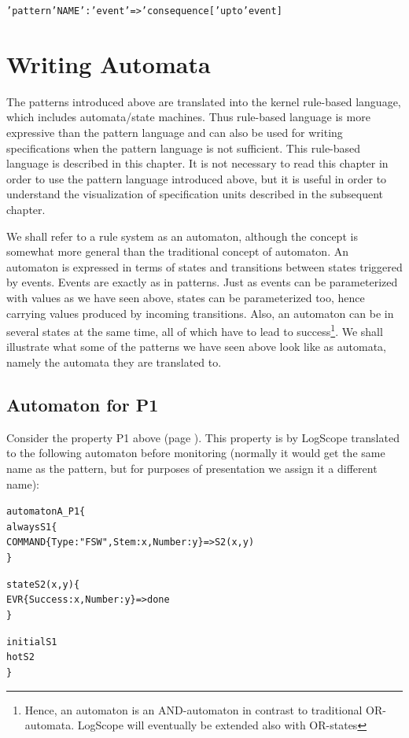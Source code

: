 \documentclass{report}
\newcommand{\logscope}{{\sc LogScope}}
\newenvironment{code}[1] %
{
\vspace{0.5cm}
\begin{center}
\begin{Sbox}
\begin{minipage}{11cm}
\begin{alltt}
{\bf\em #1}
}
{
\end{alltt}
\end{minipage}
\end{Sbox}
\setlength{\fboxsep}{8pt}
\fbox{\TheSbox}
\end{center}
\vspace{0.5cm}
}
\begin{document}
\begin{code}{}
  'pattern' NAME ':' event '=>' consequence ['upto' event]
\end{code}
  
\chapter{Writing Automata}

The patterns introduced above are translated into the kernel rule-based language,
which includes automata/state machines. Thus rule-based language is more expressive
than the pattern language and can also be used for writing specifications when the pattern
language is not sufficient. This rule-based language is described in this chapter. It is not necessary
to read this chapter in order to use the pattern language introduced above, but it is useful in order
to understand the visualization of specification units described in the subsequent chapter.

We shall refer to a rule system as an automaton, although the concept is somewhat more
general than the traditional concept of automaton. An automaton is expressed in terms of states and
transitions between states triggered by events. Events are exactly as in patterns. Just as events can be parameterized with values as we have seen above, states can be parameterized too, hence carrying values produced by incoming transitions. Also, an automaton can be in several states at the same time, all of which have to lead to success\footnote{Hence, an automaton is an AND-automaton in contrast to traditional OR-automata. \logscope{} will eventually be extended also with OR-states}. We shall illustrate what some of the patterns we have seen above look like as automata, namely the automata they are translated to.

\section{Automaton for P1}

Consider the property P1 above (page \pageref{pattern:p1}). This property is by \logscope{} translated to the following automaton before monitoring (normally it would get the
same name as the pattern, but for purposes of presentation we assign it a different name):

\begin{code}{}
  automaton A_P1 \{
    always S1 \{
      COMMAND\{Type : "FSW", Stem : x, Number : y\} => S2(x,y)
    \}

    state S2(x,y) \{
      EVR\{Success : x, Number : y\} => done
    \}

    initial S1
    hot S2
  \}
\end{code}
\end{document}
